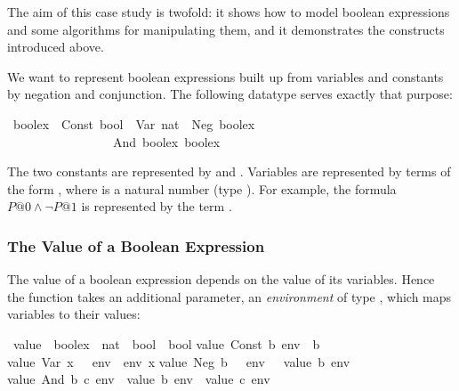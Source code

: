 %
\begin{isabellebody}%
\def\isabellecontext{Ifexpr}%
\isamarkupfalse%
%
\isamarkuptrue%
%
\begin{isamarkuptext}%
\label{sec:boolex}
The aim of this case study is twofold: it shows how to model boolean
expressions and some algorithms for manipulating them, and it demonstrates
the constructs introduced above.%
\end{isamarkuptext}%
\isamarkuptrue%
%
\isamarkuptrue%
%
\begin{isamarkuptext}%
We want to represent boolean expressions built up from variables and
constants by negation and conjunction. The following datatype serves exactly
that purpose:%
\end{isamarkuptext}%
\isamarkuptrue%
\ boolex\ {\isacharequal}\ Const\ bool\ {\isacharbar}\ Var\ nat\ {\isacharbar}\ Neg\ boolex\isanewline
\ \ \ \ \ \ \ \ \ \ \ \ \ \ \ \ {\isacharbar}\ And\ boolex\ boolex\isamarkupfalse%
%
\begin{isamarkuptext}%
\noindent
The two constants are represented by  and
. Variables are represented by terms of the form
, where  is a natural number (type ).
For example, the formula $P@0 \land \neg P@1$ is represented by the term
.

\subsubsection{The Value of a Boolean Expression}

The value of a boolean expression depends on the value of its variables.
Hence the function  takes an additional parameter, an
\emph{environment} of type , which maps variables to their
values:%
\end{isamarkuptext}%
\isamarkuptrue%
\ value\ {\isacharcolon}{\isacharcolon}\ {\isachardoublequote}boolex\ {\isasymRightarrow}\ {\isacharparenleft}nat\ {\isasymRightarrow}\ bool{\isacharparenright}\ {\isasymRightarrow}\ bool{\isachardoublequote}\isanewline
\isamarkupfalse%
\isanewline
{\isachardoublequote}value\ {\isacharparenleft}Const\ b{\isacharparenright}\ env\ {\isacharequal}\ b{\isachardoublequote}\isanewline
{\isachardoublequote}value\ {\isacharparenleft}Var\ x{\isacharparenright}\ \ \ env\ {\isacharequal}\ env\ x{\isachardoublequote}\isanewline
{\isachardoublequote}value\ {\isacharparenleft}Neg\ b{\isacharparenright}\ \ \ env\ {\isacharequal}\ {\isacharparenleft}{\isasymnot}\ value\ b\ env{\isacharparenright}{\isachardoublequote}\isanewline
{\isachardoublequote}value\ {\isacharparenleft}And\ b\ c{\isacharparenright}\ env\ {\isacharequal}\ {\isacharparenleft}value\ b\ env\ {\isasymand}\ value\ c\ env{\isacharparenright}{\isachardoublequote}\isamarkupfalse%
%
\begin{isamarkuptext}%
\noindent

\end{isamarkuptext}
\end{isabellebody}
